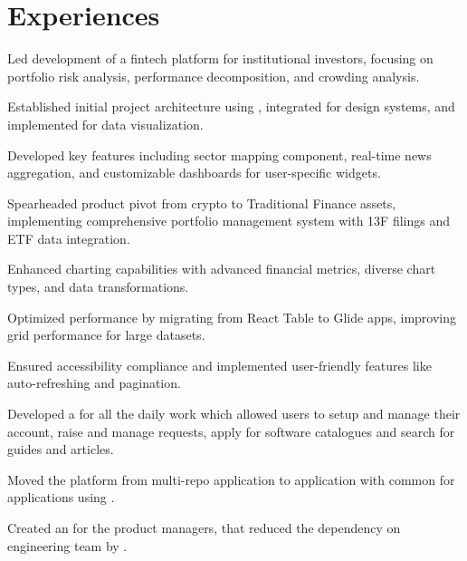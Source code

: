 \documentclass[]{deedy-resume-openfont}
\begin{document}
\begin{minipage}[t]{0.71\textwidth} 

\vspace*{-2mm}
\section{Experiences}

\vspace{\topsep} %
\begin{tightemize}
\item Led development of a fintech platform for institutional investors, focusing on portfolio risk analysis, performance decomposition, and crowding analysis.
\item Established initial project architecture using , integrated  for design systems, and implemented  for data visualization.
\item Developed key features including sector mapping component, real-time news aggregation, and customizable dashboards for user-specific widgets.
\item Spearheaded product pivot from crypto to Traditional Finance assets, implementing comprehensive portfolio management system with 13F filings and ETF data integration.
\item Enhanced charting capabilities with advanced financial metrics, diverse chart types, and data transformations.
\item Optimized performance by migrating from React Table to Glide apps, improving grid performance for large datasets.
\item Ensured accessibility compliance and implemented user-friendly features like auto-refreshing and pagination.
\end{tightemize}
\sectionsep

\begin{tightemize}
\item Developed a  for all the daily work which allowed users to setup and manage their account, raise and manage requests, apply for software catalogues and search for guides and articles.
\item Moved the platform from multi-repo application to  application with common  for applications using .
\item Created an  for the product managers, that reduced the dependency on engineering team by .
\end{tightemize}
\sectionsep


\end{minipage}
\end{document}
